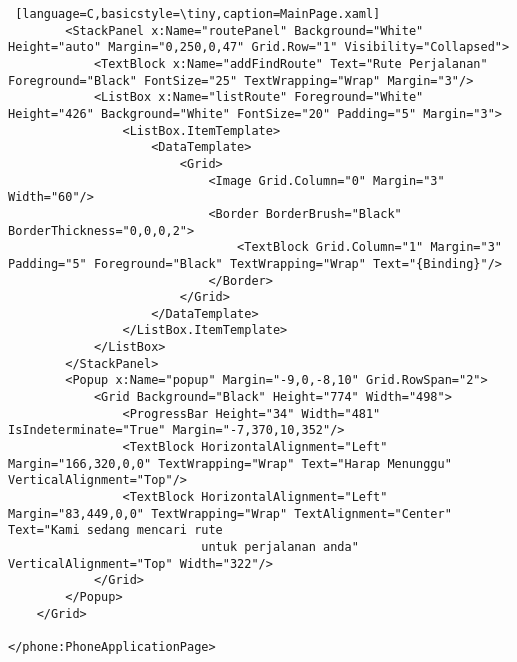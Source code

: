 \begin{lstlisting} [language=C,basicstyle=\tiny,caption=MainPage.xaml]
        <StackPanel x:Name="routePanel" Background="White" Height="auto" Margin="0,250,0,47" Grid.Row="1" Visibility="Collapsed">
            <TextBlock x:Name="addFindRoute" Text="Rute Perjalanan" Foreground="Black" FontSize="25" TextWrapping="Wrap" Margin="3"/>
            <ListBox x:Name="listRoute" Foreground="White" Height="426" Background="White" FontSize="20" Padding="5" Margin="3">
                <ListBox.ItemTemplate>
                    <DataTemplate>
                        <Grid>
                            <Image Grid.Column="0" Margin="3"  Width="60"/>
                            <Border BorderBrush="Black" BorderThickness="0,0,0,2">
                                <TextBlock Grid.Column="1" Margin="3" Padding="5" Foreground="Black" TextWrapping="Wrap" Text="{Binding}"/>
                            </Border>
                        </Grid>
                    </DataTemplate>
                </ListBox.ItemTemplate>
            </ListBox>
        </StackPanel>
        <Popup x:Name="popup" Margin="-9,0,-8,10" Grid.RowSpan="2">
            <Grid Background="Black" Height="774" Width="498">
                <ProgressBar Height="34" Width="481" IsIndeterminate="True" Margin="-7,370,10,352"/>
                <TextBlock HorizontalAlignment="Left" Margin="166,320,0,0" TextWrapping="Wrap" Text="Harap Menunggu" VerticalAlignment="Top"/>
                <TextBlock HorizontalAlignment="Left" Margin="83,449,0,0" TextWrapping="Wrap" TextAlignment="Center" Text="Kami sedang mencari rute 
                           untuk perjalanan anda" VerticalAlignment="Top" Width="322"/>
            </Grid>
        </Popup>
    </Grid>

</phone:PhoneApplicationPage>
\end{lstlisting}